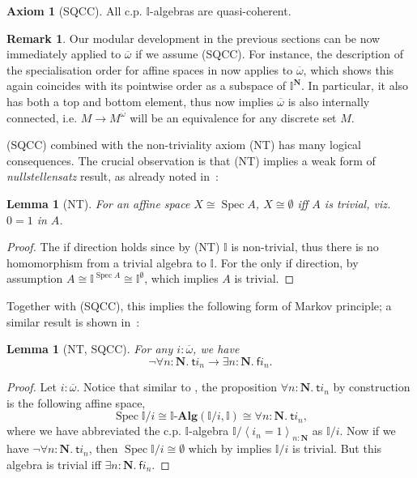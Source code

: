 \documentclass[12pt]{amsart}
\newtheorem{lemma}[theorem]{Lemma}
\theoremstyle{definition}
\newtheorem{remark}[theorem]{Remark}
\newtheorem*{axiom}{Axiom}
\newcommand{\mb}[1]{\mathbf{#1}}
\newcommand{\mbb}[1]{\mathbb{#1}}
\newcommand{\I}{\mbb I}
\newcommand{\ms}[1]{\mathsf{#1}}
\newcommand{\alg}{\text{-}\mb{Alg}}
\newcommand{\ov}[1]{\overline{#1}}
\newcommand{\pair}[1]{\left\langle#1\right\rangle}
\newcommand{\N}{\mb N}
\newcommand{\fa}[2]{\forall #1\!\colon\!\!#2.\ }
\newcommand{\ex}[2]{\exists #1\!\colon\!\!#2.\ }
\newcommand{\emp}{\emptyset}
\newcommand{\spec}{\operatorname{Spec}}
\begin{document}
\begin{axiom}[SQCC]
  All c.p. $\I$-algebras are quasi-coherent.
\end{axiom}

\begin{remark}
  Our modular development in the previous sections can be now immediately applied to $\ov\omega$ if we assume (SQCC). For instance, the description of the specialisation order for affine spaces in  now applies to $\ov\omega$, which shows this again coincides with its pointwise order as a subspace of $\I^\N$. In particular, it also has both a top and bottom element, thus  now implies $\ov\omega$ is also internally connected, i.e. $M \to M^{\ov\omega}$ will be an equivalence for any discrete set $M$. 
\end{remark}

(SQCC) combined with the non-triviality axiom (NT) has many logical consequences. The crucial observation is that (NT) implies a weak form of \emph{nullstellensatz} result, as already noted in~\cite{blechschmidt2021using,blechschmidt2020general,Cherubini_Coquand_Hutzler_2024}:

\begin{lemma}[NT]\label{lem:nulls}
  For an affine space $X \cong \spec A$, $X \cong \emp$ iff $A$ is trivial, viz. $0=1$ in $A$.
\end{lemma}
\begin{proof}
  The if direction holds since by (NT) $\I$ is non-trivial, thus there is no homomorphism from a trivial algebra to $\I$. For the only if direction, by assumption $A \cong \I^{\spec A} \cong \I^\emp$, which implies $A$ is trivial. 
\end{proof}

Together with (SQCC), this implies the following form of Markov principle; a similar result is shown in~\cite{cherubini2024foundation}:

\begin{lemma}[NT, SQCC]\label{lem:markov}
  For any $i : \ov\omega$, we have
  \[ \neg\fa{n}{\N}\ms ti_n \to \ex n\N\ms fi_n. \]
\end{lemma}
\begin{proof}
  Let $i : \ov\omega$. Notice that similar to , the proposition $\fa n\N \ms ti_n$ by construction is the following affine space, 
  \[ \spec\I/i \cong \I\alg(\I/i,\I) \cong \fa n\N \ms ti_n, \]
  where we have abbreviated the c.p. $\I$-algebra $\I/\pair{i_n=1}_{n:\N}$ as $\I/i$. Now if we have $\neg\fa n\N \ms ti_n$, then $\spec\I/i \cong \emp$ which by  implies $\I/i$ is trivial. But this algebra is trivial iff $\ex n\N \ms fi_n$.
\end{proof}
\end{document}
